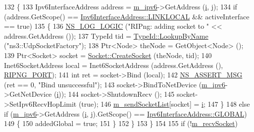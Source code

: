 \begin{DoxyCode}
132         \{
133           Ipv6InterfaceAddress address = \hyperlink{classns3_1_1RipNg_aca7a023799ce2004499a826ba5d5d3fe}{m\_ipv6}->GetAddress (\hyperlink{bernuolliDistribution_8m_a6f6ccfcf58b31cb6412107d9d5281426}{i}, j);
134           \textcolor{keywordflow}{if} (address.GetScope() == \hyperlink{classns3_1_1Ipv6InterfaceAddress_ad3f03debf9dae475b81ea9cdf81f4f27a29f5cd6ebe813216f28d906d89d4c56d}{Ipv6InterfaceAddress::LINKLOCAL} && 
      activeInterface == \textcolor{keyword}{true})
135             \{
136               \hyperlink{group__logging_ga88acd260151caf2db9c0fc84997f45ce}{NS\_LOG\_LOGIC} (\textcolor{stringliteral}{"RIPng: adding socket to "} << address.GetAddress ());
137               TypeId tid = \hyperlink{classns3_1_1TypeId_a119cf99c20931fdc294602cd360b180e}{TypeId::LookupByName} (\textcolor{stringliteral}{"ns3::UdpSocketFactory"});
138               Ptr<Node> theNode = GetObject<Node> ();
139               Ptr<Socket> socket = \hyperlink{classns3_1_1Socket_ad448a62bb50ad3dbac59c879a885a8d2}{Socket::CreateSocket} (theNode, tid);
140               Inet6SocketAddress local = Inet6SocketAddress (address.GetAddress (), 
      \hyperlink{ripng_8cc_a86ce7fe00a995035f236d2463a7b761f}{RIPNG\_PORT});
141               \textcolor{keywordtype}{int} ret = socket->Bind (local);
142               \hyperlink{assert_8h_aff5ece9066c74e681e74999856f08539}{NS\_ASSERT\_MSG} (ret == 0, \textcolor{stringliteral}{"Bind unsuccessful"});
143               socket->BindToNetDevice (\hyperlink{classns3_1_1RipNg_aca7a023799ce2004499a826ba5d5d3fe}{m\_ipv6}->GetNetDevice (\hyperlink{bernuolliDistribution_8m_a6f6ccfcf58b31cb6412107d9d5281426}{i}));
144               socket->ShutdownRecv ();
145               socket->SetIpv6RecvHopLimit (\textcolor{keyword}{true});
146               \hyperlink{classns3_1_1RipNg_a761d304dc3d34cd528afe87c5fa8090b}{m\_sendSocketList}[socket] = \hyperlink{bernuolliDistribution_8m_a6f6ccfcf58b31cb6412107d9d5281426}{i};
147             \}
148           \textcolor{keywordflow}{else} \textcolor{keywordflow}{if} (\hyperlink{classns3_1_1RipNg_aca7a023799ce2004499a826ba5d5d3fe}{m\_ipv6}->GetAddress (\hyperlink{bernuolliDistribution_8m_a6f6ccfcf58b31cb6412107d9d5281426}{i}, j).GetScope() == 
      \hyperlink{classns3_1_1Ipv6InterfaceAddress_ad3f03debf9dae475b81ea9cdf81f4f27aaf504a3b8c1562206e6ba65b4a6cff1d}{Ipv6InterfaceAddress::GLOBAL})
149             \{
150               addedGlobal = \textcolor{keyword}{true};
151             \}
152         \}
153     \}
154 
155   \textcolor{keywordflow}{if} (!\hyperlink{classns3_1_1RipNg_a87437a46d9f4e0951f9d4c6b11208d4f}{m\_recvSocket})

\end{DoxyCode}

